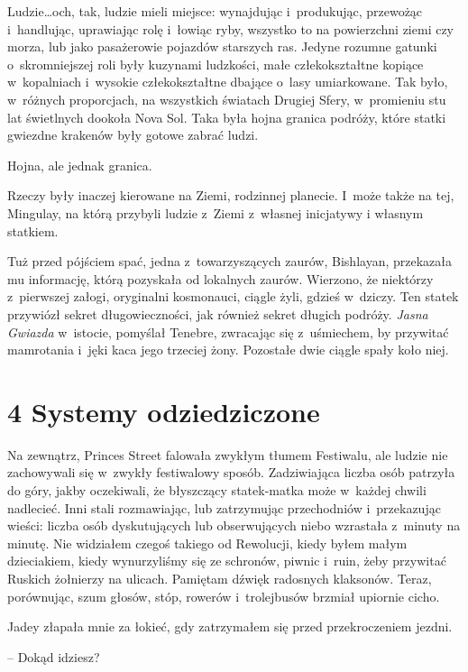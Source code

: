 \documentclass[oneside,polish,12pt,sfheadings]{mwbk}
\begin{document}
Ludzie\ldots och, tak, ludzie mieli miejsce: wynajdując i~produkując,
przewożąc i~handlując, uprawiając rolę i~łowiąc ryby, wszystko to na
powierzchni ziemi czy morza, lub jako pasażerowie pojazdów starszych
ras. Jedyne rozumne gatunki o~skromniejszej roli były kuzynami
ludzkości, małe człekokształtne kopiące w~kopalniach i~wysokie
człekokształtne dbające o~lasy umiarkowane. Tak było, w~różnych
proporcjach, na wszystkich światach Drugiej Sfery, w~promieniu stu lat
świetlnych dookoła Nova Sol. Taka była hojna granica podróży, które
statki gwiezdne krakenów były gotowe zabrać ludzi.

Hojna, ale jednak granica.

Rzeczy były inaczej kierowane na Ziemi, rodzinnej planecie. I~może także
na tej, Mingulay, na którą przybyli ludzie z~Ziemi z~własnej inicjatywy
i własnym statkiem.

Tuż przed pójściem spać, jedna z~towarzyszących zaurów, Bishlayan,
przekazała mu informację, którą pozyskała od lokalnych zaurów. Wierzono,
że niektórzy z~pierwszej załogi, oryginalni kosmonauci, ciągle żyli,
gdzieś w~dziczy. Ten statek przywiózł sekret długowieczności, jak
również sekret długich podróży. \emph{Jasna Gwiazda} w~istocie, pomyślał
Tenebre, zwracając się z~uśmiechem, by przywitać mamrotania i~jęki kaca
jego trzeciej żony. Pozostałe dwie ciągle spały koło niej.



\chapter[Systemy odziedziczone]{4 Systemy odziedziczone}

Na zewnątrz, Princes Street falowała zwykłym tłumem Festiwalu, ale
ludzie nie zachowywali się w~zwykły festiwalowy sposób. Zadziwiająca
liczba osób patrzyła do góry, jakby oczekiwali, że błyszczący
statek-matka może w~każdej chwili nadlecieć. Inni stali rozmawiając, lub
zatrzymując przechodniów i~przekazując wieści: liczba osób dyskutujących
lub obserwujących niebo wzrastała z~minuty na minutę. Nie widziałem
czegoś takiego od Rewolucji, kiedy byłem małym dzieciakiem, kiedy
wynurzyliśmy się ze schronów, piwnic i~ruin, żeby przywitać Ruskich
żołnierzy na ulicach. Pamiętam dźwięk radosnych klaksonów. Teraz,
porównując, szum głosów, stóp, rowerów i~trolejbusów brzmiał upiornie
cicho.

Jadey złapała mnie za łokieć, gdy zatrzymałem się przed przekroczeniem
jezdni.

-- Dokąd idziesz?
\end{document}
